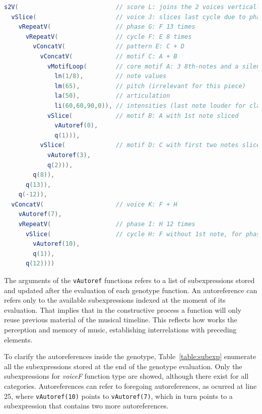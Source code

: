 \documentclass{article}
\begin{document}
\begin{lstlisting}[floatplacement=H, language=Java, caption={Decoded genotype of \emph{Clapping Music} model.}, label={lst:clapgeno}]
s2V(                           // score L: joins the 2 voices vertically
  vSlice(                      // voice J: slices last cycle due to phase shift
    vRepeatV(                  // phase G: F 13 times
      vRepeatV(                // cycle F: E 8 times 
        vConcatV(              // pattern E: C + D
          vConcatV(            // motif C: A + B
            vMotifLoop(        // core motif A: 3 8th-notes and a silence
              ln(1/8),         // note values
              lm(65),          // pitch (irrelevant for this piece)
              la(50),          // articulation
              li(60,60,90,0)), // intensities (last note louder for clarity) 
            vSlice(            // motif B: A with 1st note sliced
              vAutoref(0),
              q(1))),
          vSlice(              // motif D: C with first two notes sliced
            vAutoref(3),
            q(2))),
        q(8)),
      q(13)),
    q(-12)),
  vConcatV(                    // voice K: F + H
    vAutoref(7),
    vRepeatV(                  // phase I: H 12 times 
      vSlice(                  // cycle H: F without 1st note, for phase shift
        vAutoref(10),
        q(1)),
      q(12))))
\end{lstlisting}

The arguments of the \texttt{vAutoref} functions refers to a list of subexpressions stored and updated after the evaluation of each genotype function. An autoreference can refers only to the available subexpressions indexed at the moment of its evaluation. That implies that in the constructive process a function will only reuse previous material of the musical timeline. This reflects how works the perception and memory of music, establishing interrelations with preceding elements.

To clarify the autoreferences inside the genotype, Table~\ref{table:subexp} enumerate all the subexpressions stored at the end of the genotype evaluation. Only the subexpressions for \emph{voiceF} function type are showed, although there exist for all categories. Autoreferences can refer to foregoing autoreferences, as ocurred at line 25, where \texttt{vAutoref(10)} points to \texttt{vAutoref(7)}, which in turn points to a subexpression that contains two more autoreferences.
\end{document}
